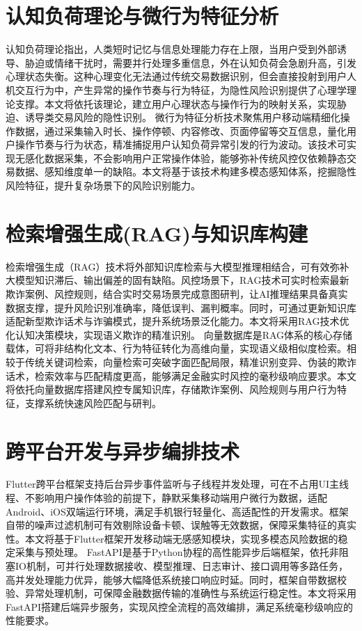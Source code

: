 \documentclass{xduugthesis}
\begin{document}
\section{认知负荷理论与微行为特征分析}
认知负荷理论指出，人类短时记忆与信息处理能力存在上限，当用户受到外部诱导、胁迫或情绪干扰时，需要并行处理多重信息，外在认知负荷会急剧升高，引发心理状态失衡\cite{ibraheem2025duress}。这种心理变化无法通过传统交易数据识别，但会直接投射到用户人机交互行为中，产生异常的操作节奏与行为特征，为隐性风险识别提供了心理学理论支撑。本文将依托该理论，建立用户心理状态与操作行为的映射关系，实现胁迫、诱导类交易风险的隐性识别。
微行为特征分析技术聚焦用户移动端精细化操作数据，通过采集输入时长、操作停顿、内容修改、页面停留等交互信息，量化用户操作节奏与行为状态，精准捕捉用户认知负荷异常引发的行为波动\cite{li2024cognitive}。该技术可实现无感化数据采集，不会影响用户正常操作体验，能够弥补传统风控仅依赖静态交易数据、感知维度单一的缺陷。本文将基于该技术构建多模态感知体系，挖掘隐性风险特征，提升复杂场景下的风险识别能力。

\section{检索增强生成(RAG)与知识库构建}
检索增强生成（RAG）技术将外部知识库检索与大模型推理相结合，可有效弥补大模型知识滞后、输出偏差的固有缺陷\cite{srinivasan2025rag}。风控场景下，RAG技术可实时检索最新欺诈案例、风控规则，结合实时交易场景完成意图研判，让AI推理结果具备真实数据支撑，提升风险识别准确率，降低误判、漏判概率。同时，可通过更新知识库适配新型欺诈话术与诈骗模式，提升系统场景泛化能力。本文将采用RAG技术优化认知决策模块，实现语义欺诈的精准识别。
向量数据库是RAG体系的核心存储载体，可将非结构化文本、行为特征转化为高维向量，实现语义级相似度检索。相较于传统关键词检索，向量检索可突破字面匹配局限，精准识别变异、伪装的欺诈话术，检索效率与匹配精度更高，能够满足金融实时风控的毫秒级响应要求。本文将依托向量数据库搭建风控专属知识库，存储欺诈案例、风险规则与用户行为特征，支撑系统快速风险匹配与研判。

\section{跨平台开发与异步编排技术}
Flutter跨平台框架支持后台异步事件监听与子线程并发处理，可在不占用UI主线程、不影响用户操作体验的前提下，静默采集移动端用户微行为数据，适配Android、iOS双端运行环境，满足手机银行轻量化、高适配性的开发需求。框架自带的噪声过滤机制可有效剔除设备卡顿、误触等无效数据，保障采集特征的真实性。本文将基于Flutter框架开发移动端无感感知模块，实现多模态风险数据的稳定采集与预处理。
FastAPI是基于Python协程的高性能异步后端框架，依托非阻塞IO机制，可并行处理数据接收、模型推理、日志审计、接口调用等多路任务，高并发处理能力优异，能够大幅降低系统接口响应时延。同时，框架自带数据校验、异常处理机制，可保障金融数据传输的准确性与系统运行稳定性。本文将采用FastAPI搭建后端异步服务，实现风控全流程的高效编排，满足系统毫秒级响应的性能要求。
\end{document}
